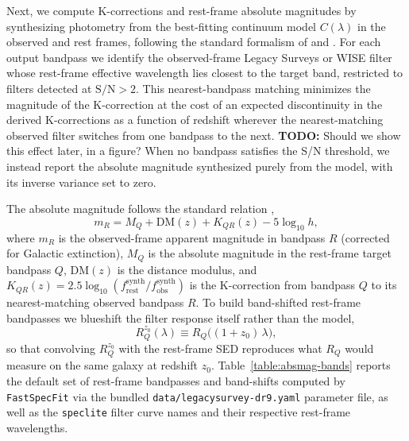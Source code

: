 \documentclass[modern,linenumbers]{aastex701}
\newcommand{\todo}[1]{{\color{red}\textbf{TODO:} #1}}
\newcommand{\fastspecfit}{\texttt{FastSpecFit}}
\begin{document}
Next, we compute K-corrections and rest-frame absolute magnitudes by
synthesizing photometry from the best-fitting continuum model
$C(\lambda)$ in the observed and rest frames, following the standard
formalism of \citet{hogg02a} and \citet{blanton03a}. For each output
bandpass we identify the observed-frame Legacy Surveys or WISE filter
whose rest-frame effective wavelength lies closest to the target band,
restricted to filters detected at $\mathrm{S/N}>2$. This
nearest-bandpass matching minimizes the magnitude of the K-correction
at the cost of an expected discontinuity in the derived K-corrections
as a function of redshift wherever the nearest-matching observed
filter switches from one bandpass to the next. \todo{Should we show
  this effect later, in a figure?} When no bandpass satisfies the S/N
threshold, we instead report the absolute magnitude synthesized purely
from the model, with its inverse variance set to zero.

The absolute magnitude follows the standard relation \citep{blanton07a},
\begin{equation}
  m_R = M_Q + \mathrm{DM}(z) + K_{QR}(z) - 5\log_{10} h,
  \label{eq:kcorr}
\end{equation}
where $m_R$ is the observed-frame apparent magnitude in bandpass $R$
(corrected for Galactic extinction), $M_Q$ is the absolute magnitude
in the rest-frame target bandpass $Q$, $\mathrm{DM}(z)$ is the
distance modulus, and $K_{QR}(z) =
2.5\log_{10}(f_\mathrm{rest}^\mathrm{synth}/f_\mathrm{obs}^\mathrm{synth})$
is the K-correction from bandpass $Q$ to its nearest-matching observed
bandpass $R$. To build band-shifted rest-frame bandpasses
\citep{blanton03a} we blueshift the filter response itself rather than
the model,
\begin{equation}
  R_Q^{z_0}(\lambda) \equiv R_Q\bigl((1+z_0)\,\lambda\bigr),
  \label{eq:bandshift}
\end{equation}
so that convolving $R_Q^{z_0}$ with the rest-frame SED reproduces what
$R_Q$ would measure on the same galaxy at redshift
$z_0$. Table~\ref{table:absmag-bands} reports the default set of
rest-frame bandpasses and band-shifts computed by \fastspecfit{} via
the bundled \texttt{data/legacysurvey-dr9.yaml} parameter file, as
well as the \texttt{speclite} filter curve names and their respective
rest-frame wavelengths.


\end{document}
